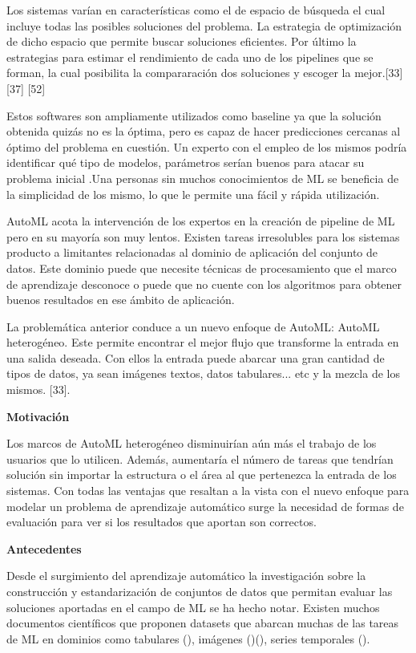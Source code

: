 Los sistemas varían en características como el de espacio de búsqueda el cual incluye todas las posibles soluciones del problema. La estrategia de 
optimización de dicho espacio que permite buscar soluciones eficientes. Por último la estrategias para estimar el rendimiento de cada uno de 
los pipelines que se forman, la cual posibilita la compararación dos soluciones y escoger la mejor.[33] [37] [52]


Estos softwares son ampliamente utilizados como baseline ya que la solución obtenida quizás no es la óptima, pero es capaz de hacer 
predicciones cercanas al óptimo del problema en cuestión. Un experto con el empleo de los mismos podría identificar qué tipo de 
modelos, parámetros serían buenos para atacar su problema inicial .Una personas sin muchos conocimientos de ML se beneficia de la simplicidad de los mismo, 
lo que le permite una fácil y rápida utilización.

AutoML acota la intervención de los expertos en la creación de pipeline de ML pero en su mayoría son muy lentos. Existen tareas 
irresolubles para los sistemas producto a limitantes relacionadas al dominio de aplicación del conjunto de datos. Este dominio puede 
que necesite técnicas de procesamiento que el marco de aprendizaje desconoce o puede que no cuente con los algoritmos para obtener 
buenos resultados en ese ámbito de aplicación.

La problemática anterior conduce a un nuevo enfoque de AutoML: AutoML heterogéneo. Este permite encontrar el mejor flujo que 
transforme la entrada en una salida deseada. Con ellos la entrada puede abarcar una gran cantidad de tipos de datos, ya sean 
imágenes textos, datos tabulares... etc y la mezcla de los mismos. [33].

\begin{flushleft} 
{\Large { \textbf{Motivación} }}
\end{flushleft}
Los marcos de AutoML heterogéneo disminuirían aún más el trabajo de los usuarios que lo utilicen. Además, aumentaría el número de 
tareas que tendrían solución sin importar la estructura o el área al que pertenezca la entrada de los sistemas. Con todas las ventajas 
que resaltan a la vista con el nuevo enfoque para modelar un problema de aprendizaje automático surge la necesidad de formas de evaluación para ver si los 
resultados que aportan son correctos.


\begin{flushleft} 
    {\Large { \textbf{Antecedentes}}}
\end{flushleft}
Desde el surgimiento del aprendizaje automático la investigación sobre la construcción y estandarización de conjuntos de datos que 
permitan evaluar las soluciones aportadas en el campo de ML se ha hecho notar. Existen muchos documentos científicos que proponen 
datasets que abarcan muchas de las tareas de ML en dominios como tabulares (\cite{2}), imágenes (\cite{1})(\cite{3}), series temporales (\cite{7}).

